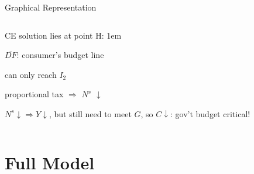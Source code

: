 \documentclass[11pt,aspectratio=43]{beamer}
\let\olditemize=\itemize
\let\endolditemize=\enditemize
\renewenvironment{itemize}{\olditemize \itemsep1em}{\endolditemize}
\theoremstyle{definition}
\begin{document}
\begin{frame}{Graphical Representation}
\begin{columns}
\begin{column}{0.5\textwidth}
            CE solution lies at point H:
            \begin{itemize}
                \item $\overline{DF}$: consumer’s budget line
                \item can only reach $ I_{2} $
                \item proportional tax $ \Rightarrow  $ $ N^{s} $ $ \downarrow  $
                \item $ N^{s} $$ \downarrow $$ \Rightarrow $$ Y $$\downarrow  $, but still need to meet $ G $, so $ C \downarrow  $: gov’t budget critical!
            \end{itemize}
        \end{column}
    \end{columns}
\end{frame}

\section{Full Model}
\label{sec:Full_Model}
\end{document}
